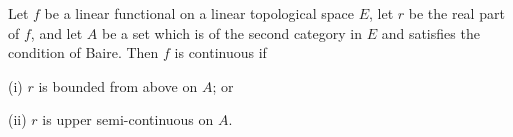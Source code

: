 Let $f$ be a linear functional on a linear topological space $E$, let $r$ be the real part of $f$, and let $A$ be a set which is of the second category in $E$ and satisfies the condition of Baire. Then $f$ is continuous if

(i) $r$ is bounded from above on $A$; or

(ii) $r$ is upper semi-continuous on $A$.
